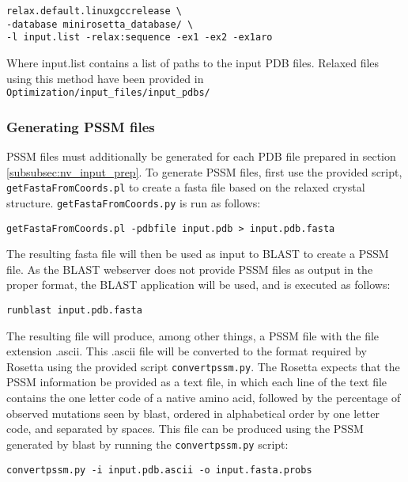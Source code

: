 \singlespace
\begin{Verbatim}
relax.default.linuxgccrelease \
-database minirosetta_database/ \
-l input.list -relax:sequence -ex1 -ex2 -ex1aro
\end{Verbatim}
\doublespace

Where input.list contains a list of paths to the input \ac{PDB} files.
Relaxed files using this method have been provided in \texttt{Optimization/input\_files/input\_pdbs/}

\subsubsection{Generating \acs{PSSM} files}
\ac{PSSM} files must additionally be generated for each \ac{PDB} file prepared in section \ref{subsubsec:nv_input_prep}.
To generate \ac{PSSM} files, first use the provided script, \texttt{getFastaFromCoords.pl} to create a fasta file based on the relaxed crystal structure.
\texttt{getFastaFromCoords.py} is run as follows:

\singlespace
\begin{Verbatim}
getFastaFromCoords.pl -pdbfile input.pdb > input.pdb.fasta
\end{Verbatim}
\doublespace

The resulting fasta file will then be used as input to \ac{BLAST} to create a \ac{PSSM} file.
As the \ac{BLAST} webserver does not provide \ac{PSSM} files as output in the proper format, the \ac{BLAST} application will be used, and is executed as follows:

\singlespace
\begin{Verbatim}
runblast input.pdb.fasta
\end{Verbatim}
\doublespace

The resulting file will produce, among other things, a \ac{PSSM} file with the file extension .ascii.
This .ascii file will be converted to the format required by Rosetta using the provided script \texttt{convertpssm.py}.
The Rosetta expects that the \ac{PSSM} information be provided as a text file, in which each line of the text file contains the one letter code of a native amino acid, followed by the percentage of observed mutations seen by blast, ordered in alphabetical order by one letter code, and separated by spaces.
This file can be produced using the \ac{PSSM} generated by blast by running the \texttt{convertpssm.py} script:

\singlespace
\begin{Verbatim}
convertpssm.py -i input.pdb.ascii -o input.fasta.probs
\end{Verbatim}
\doublespace

